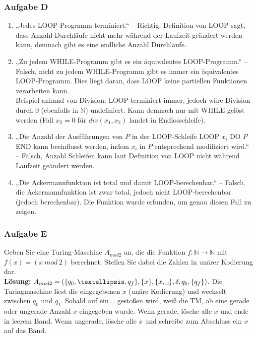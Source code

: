 \documentclass[a4paper,10pt]{article}
\newcommand{\blank}{\text{\textvisiblespace}}
\begin{document}
    \subsubsection*{Aufgabe D}
        \begin{enumerate}
            \item „Jedes LOOP-Programm terminiert.“ – Richtig. Definition von LOOP sagt, dass Anzahl Durchläufe nicht mehr während der Laufzeit geändert werden kann, demnach gibt es eine endliche Anzahl Durchläufe.

            \item „Zu jedem WHILE-Programm gibt es ein äquivalentes LOOP-Programm.“ – Falsch, nicht zu jedem WHILE-Programm gibt es immer ein äquivalentes LOOP-Programm. Dies liegt daran, dass LOOP keine partiellen Funktionen verarbeiten kann. \\
            Beispiel anhand von Division: LOOP terminiert immer, jedoch wäre Division durch $0$ (ebenfalls in $\mathbb{N}$) undefiniert. Kann demnach nur mit WHILE gelöst werden (Fall $x_2 = 0$ für $div(x_1, x_2)$ landet in Endlosschleife).

            \item „Die Anzahl der Ausführungen von $P$ in der LOOP-Schleife LOOP $x_i$ DO $P$ END kann beeinflusst werden, indem $x_i$ in $P$ entsprechend modifiziert wird.“ – Falsch, Anzahl Schleifen kann laut Definition von LOOP nicht während Laufzeit geändert werden.

            \item „Die Ackermannfunktion ist total und damit LOOP-berechenbar.“ – Falsch, die Ackermannfunktion ist zwar total, jedoch nicht LOOP-berechenbar (jedoch berechenbar). Die Funktion wurde erfunden, um genau diesen Fall zu zeigen.
        \end{enumerate}

    \subsubsection*{Aufgabe E}
        Geben Sie eine Turing-Maschine $A_{mod2}$ an, die die Funktion  $f: \mathbb{N} \to \mathbb{N}$ mit $f(x) = (x~mod~ 2)$ berechnet. Stellen Sie dabei die Zahlen in unärer Kodierung dar. \\
        \textbf{Lösung:} $A_{mod2} = (\{q_0,…,q_f\}, \{x\}, \{x, \blank\}, \delta, q_0, \{q_f\})$. Die Turingmaschine liest die eingegebenen $x$ (unäre Kodierung) und wechselt zwischen $q_0$ und $q_1$. Sobald auf ein $\blank$ gestoßen wird, weiß die TM, ob eine gerade oder ungerade Anzahl $x$ eingegeben wurde. Wenn gerade, lösche alle $x$ und ende in leerem Band. Wenn ungerade, lösche alle $x$ und schreibe zum Abschluss ein $x$ auf das Band.
\end{document}
